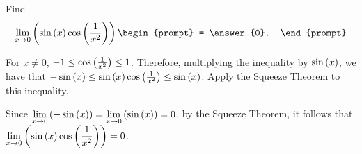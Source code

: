 \documentclass{ximera}
\author{Gregory Hartman \and Matthew Carr}
\begin{document}
\begin{exercise}





Find 
\[
\lim_{x\to0}\p{\sin\p{x}\cos\p{\frac{1}{x^2}}}
\begin{prompt}
= \answer{0}.
\end{prompt}
\]

\begin{hint}
For $x\ne0$, $-1\le\cos\left(\frac{1}{x^2}\right)\le1$. Therefore, multiplying the inequality by $\sin\left(x\right)$, we have that $-\sin\left(x\right)\le\sin\left(x\right)\cos\left(\frac{1}{x^2}\right)\le\sin\left(x\right)$. Apply the Squeeze Theorem to this inequality.
\end{hint}
\begin{hint}
Since $\lim_{x\to0}\p{-\sin\p{x}}=\lim_{x\to0}\p{\sin\p{x}}=0$, by the Squeeze Theorem, it follows that $\lim_{x\to0}\p{\sin\p{x}\cos\p{\frac{1}{x^2}}}=0$.
\end{hint}

\end{exercise}
\end{document}
